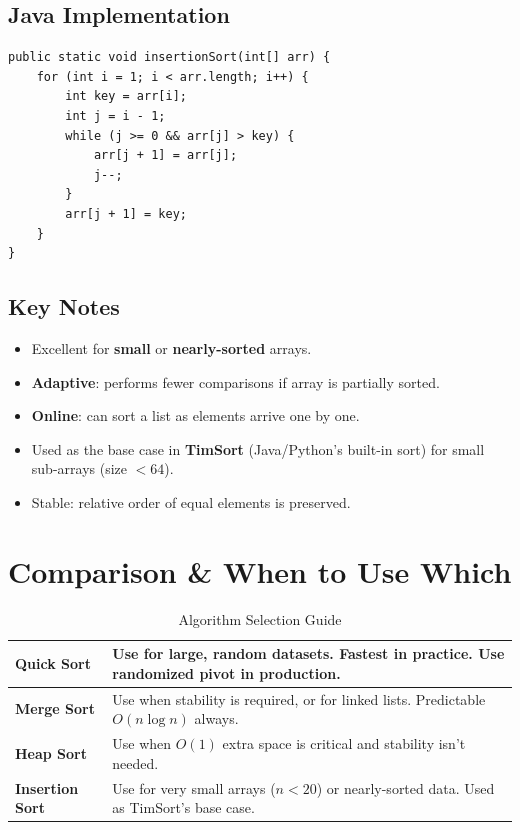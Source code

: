 \documentclass[12pt,a4paper]{article}
\begin{document}
\subsection{Java Implementation}
\begin{lstlisting}[style=javastyle, caption={Insertion Sort — Java}]
public static void insertionSort(int[] arr) {
    for (int i = 1; i < arr.length; i++) {
        int key = arr[i];
        int j = i - 1;
        while (j >= 0 && arr[j] > key) {
            arr[j + 1] = arr[j];
            j--;
        }
        arr[j + 1] = key;
    }
}
\end{lstlisting}

\subsection{Key Notes}
\begin{itemize}
    \item Excellent for \textbf{small} or \textbf{nearly-sorted} arrays.
    \item \textbf{Adaptive}: performs fewer comparisons if array is partially sorted.
    \item \textbf{Online}: can sort a list as elements arrive one by one.
    \item Used as the base case in \textbf{TimSort} (Java/Python's built-in sort) for small sub-arrays (size $< 64$).
    \item Stable: relative order of equal elements is preserved.
\end{itemize}

\newpage

\section{Comparison \& When to Use Which}

\begin{table}[h!]
\centering
\renewcommand{\arraystretch}{1.5}
\begin{tabular}{|>{\bfseries}l|p{10cm}|}
\hline
Quick Sort       & Use for large, random datasets. Fastest in practice. Use randomized pivot in production. \\
\hline
Merge Sort       & Use when stability is required, or for linked lists. Predictable $O(n \log n)$ always. \\
\hline
Heap Sort        & Use when $O(1)$ extra space is critical and stability isn't needed. \\
\hline
Insertion Sort   & Use for very small arrays ($n < 20$) or nearly-sorted data. Used as TimSort's base case. \\
\hline
\end{tabular}
\caption{Algorithm Selection Guide}
\end{table}
\end{document}
